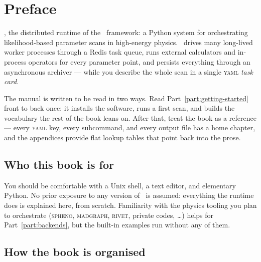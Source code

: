 \chapter{Preface}
\label{ch:preface}

, the distributed runtime of the \Jarvis\
framework: a Python system for orchestrating likelihood-based parameter scans in
high-energy physics. \Jtwo\ drives many long-lived worker processes through a Redis task
queue, runs external calculators and in-process operators for every parameter point, and
persists everything through an asynchronous archiver --- while you describe the whole scan
in a single \textsc{yaml} \emph{task card}.

The manual is written to be read in two ways. Read Part~\ref{part:getting-started} front to
back once: it installs the software, runs a first scan, and builds the vocabulary the rest
of the book leans on. After that, treat the book as a reference --- every \textsc{yaml} key,
every \cli{Jarvis} subcommand, and every output file has a home chapter, and the
appendices provide flat lookup tables that point back into the prose.

\section{Who this book is for}

You should be comfortable with a Unix shell, a text editor, and elementary Python. No prior
exposure to any version of \Jarvis\ is assumed: everything the runtime does is explained
here, from scratch. Familiarity with the physics tooling you plan to orchestrate
(\textsc{spheno}, \textsc{madgraph}, \textsc{rivet}, private codes, \ldots) helps for
Part~\ref{part:backends}, but the built-in examples run without any of them.

\section{How the book is organised}

